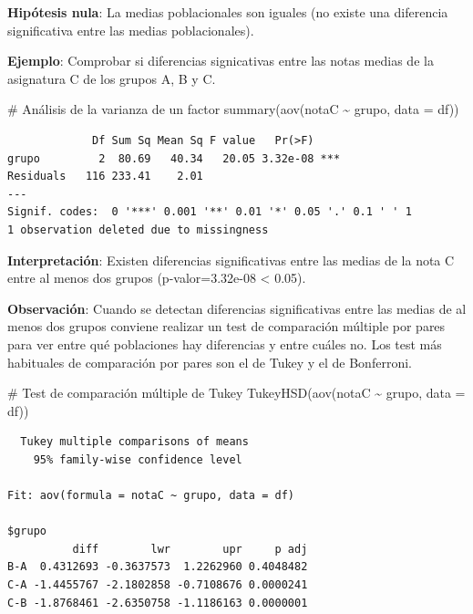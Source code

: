 \documentclass[
  a4paper,
]{scrreport}
\newenvironment{Shaded}{\begin{snugshade}}{\end{snugshade}}
\newcommand{\AttributeTok}[1]{\textcolor[rgb]{0.40,0.45,0.13}{#1}}
\newcommand{\CommentTok}[1]{\textcolor[rgb]{0.37,0.37,0.37}{#1}}
\newcommand{\FunctionTok}[1]{\textcolor[rgb]{0.28,0.35,0.67}{#1}}
\newcommand{\NormalTok}[1]{\textcolor[rgb]{0.00,0.23,0.31}{#1}}
\newcommand{\SpecialCharTok}[1]{\textcolor[rgb]{0.37,0.37,0.37}{#1}}
\theoremstyle{definition}
\theoremstyle{definition}
\theoremstyle{remark}
\begin{document}
\textbf{Hipótesis nula}: La medias poblacionales son iguales (no existe
una diferencia significativa entre las medias poblacionales).

\textbf{Ejemplo}: Comprobar si diferencias signicativas entre las notas
medias de la asignatura C de los grupos A, B y C.

\begin{Shaded}
\begin{Highlighting}[]
\CommentTok{\# Análisis de la varianza de un factor}
\FunctionTok{summary}\NormalTok{(}\FunctionTok{aov}\NormalTok{(notaC }\SpecialCharTok{\textasciitilde{}}\NormalTok{ grupo, }\AttributeTok{data =}\NormalTok{ df))}
\end{Highlighting}
\end{Shaded}

\begin{verbatim}
             Df Sum Sq Mean Sq F value   Pr(>F)    
grupo         2  80.69   40.34   20.05 3.32e-08 ***
Residuals   116 233.41    2.01                     
---
Signif. codes:  0 '***' 0.001 '**' 0.01 '*' 0.05 '.' 0.1 ' ' 1
1 observation deleted due to missingness
\end{verbatim}

\textbf{Interpretación}: Existen diferencias significativas entre las
medias de la nota C entre al menos dos grupos (p-valor=3.32e-08
\textless{} 0.05).

\textbf{Observación}: Cuando se detectan diferencias significativas
entre las medias de al menos dos grupos conviene realizar un test de
comparación múltiple por pares para ver entre qué poblaciones hay
diferencias y entre cuáles no. Los test más habituales de comparación
por pares son el de Tukey y el de Bonferroni.

\begin{Shaded}
\begin{Highlighting}[]
\CommentTok{\# Test de comparación múltiple de Tukey}
\FunctionTok{TukeyHSD}\NormalTok{(}\FunctionTok{aov}\NormalTok{(notaC }\SpecialCharTok{\textasciitilde{}}\NormalTok{ grupo, }\AttributeTok{data =}\NormalTok{ df))}
\end{Highlighting}
\end{Shaded}

\begin{verbatim}
  Tukey multiple comparisons of means
    95% family-wise confidence level

Fit: aov(formula = notaC ~ grupo, data = df)

$grupo
          diff        lwr        upr     p adj
B-A  0.4312693 -0.3637573  1.2262960 0.4048482
C-A -1.4455767 -2.1802858 -0.7108676 0.0000241
C-B -1.8768461 -2.6350758 -1.1186163 0.0000001
\end{verbatim}
\end{document}
